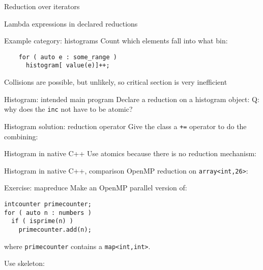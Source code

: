 \documentclass[10pt]{beamer}
\begin{document}
\begin{numberedframe}{Reduction over iterators}
  
\end{numberedframe}

\begin{numberedframe}{Lambda expressions in declared reductions}
  
\end{numberedframe}


\begin{numberedframe}{Example category: histograms}
  Count which elements fall into what bin:
  \begin{lstlisting}
    for ( auto e : some_range )
      histogram[ value(e)]++;
  \end{lstlisting}
  Collisions are possible, but unlikely, so critical section is very inefficient
\end{numberedframe}

\begin{numberedframe}{Histogram: intended main program}
  Declare a reduction on a histogram object:
  Q: why does the \lstinline{inc} not have to be atomic?
\end{numberedframe}

\begin{numberedframe}{Histogram solution: reduction operator}
  Give the class a \lstinline{+=} operator to do the combining:
  \footnotesize
\end{numberedframe}

\begin{numberedframe}{Histogram in native C++}
  Use atomics because there is no reduction mechanism:
\end{numberedframe}

\begin{numberedframe}{Histogram in native C++, comparison}
  OpenMP reduction on \lstinline{array<int,26>}:
  \footnotesize
  
\end{numberedframe}

\begin{numberedframe}{Exercise: mapreduce}
  Make an OpenMP parallel version of:
\begin{lstlisting}
intcounter primecounter;
for ( auto n : numbers )
  if ( isprime(n) )
    primecounter.add(n);
\end{lstlisting}
  where \lstinline{primecounter} contains a \lstinline|map<int,int>|.

  Use skeleton:   
\end{numberedframe}
\end{document}
